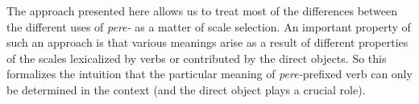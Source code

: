 


The approach presented here allows us to treat most of the differences between the different uses of \textit{pere-} as a matter of scale selection. An important property of such an approach is that various meanings arise as a result of different properties of the scales lexicalized by verbs or contributed by the direct objects. So this formalizes the intuition that the particular meaning of \textit{pere-}prefixed verb can only be determined in the context (and the direct object plays a crucial role). 

